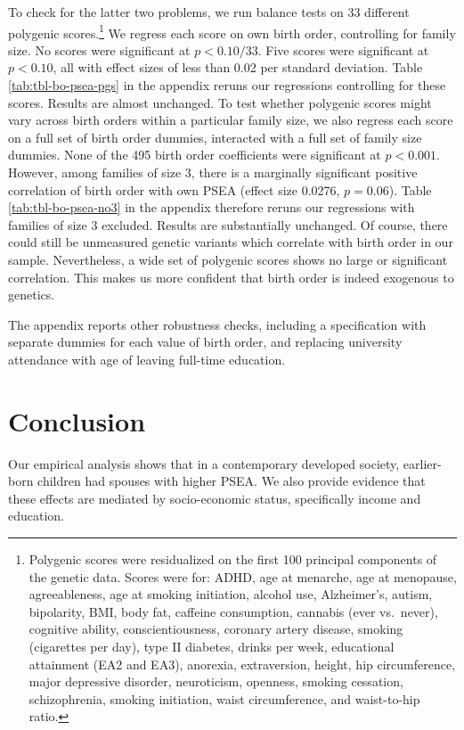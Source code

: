 \documentclass[
]{article}
\begin{document}
To check for the latter two problems, we run balance tests on 33 different
polygenic scores.\footnote{Polygenic scores were residualized on the first 100 principal
  components of the genetic data. Scores were for: ADHD, age at
  menarche, age at menopause, agreeableness, age at smoking
  initiation, alcohol use, Alzheimer's, autism, bipolarity, BMI, body
  fat, caffeine consumption, cannabis (ever vs.~never), cognitive
  ability, conscientiousness, coronary artery disease, smoking
  (cigarettes per day), type II diabetes, drinks per week, educational
  attainment (EA2 and EA3), anorexia, extraversion, height, hip
  circumference, major depressive disorder, neuroticism, openness,
  smoking cessation, schizophrenia, smoking initiation, waist
  circumference, and waist-to-hip ratio.} We regress each score on own birth order, controlling for
family size. No scores were significant at \(p < 0.10/33\). Five scores were
significant at \(p < 0.10\), all with effect sizes of less than 0.02 per standard
deviation. Table \ref{tab:tbl-bo-psea-pgs} in the appendix reruns our
regressions controlling for these scores. Results are almost unchanged. To test
whether polygenic scores might vary across birth orders within a particular
family size, we also regress each score on a full set of birth order dummies,
interacted with a full set of family size dummies. None of the
495 birth order coefficients were significant at \(p < 0.001\).
However, among families of size 3, there is a marginally significant positive
correlation of birth order with own PSEA (effect size
0.0276, \(p = 0.06\)). Table
\ref{tab:tbl-bo-psea-no3} in the appendix therefore reruns our regressions with
families of size 3 excluded. Results are substantially unchanged. Of course,
there could still be unmeasured genetic variants which correlate with birth
order in our sample. Nevertheless, a wide set of polygenic scores shows no large
or significant correlation. This makes us more confident that birth order is
indeed exogenous to genetics.

The appendix reports other robustness checks, including a specification with
separate dummies for each value of birth order, and replacing university attendance
with age of leaving full-time education.

\hypertarget{conclusion}{%
\section{Conclusion}\label{conclusion}}

Our empirical analysis shows that in a contemporary developed society,
earlier-born children had spouses with higher PSEA. We also provide
evidence that these effects are mediated by socio-economic status, specifically
income and education.
\end{document}
